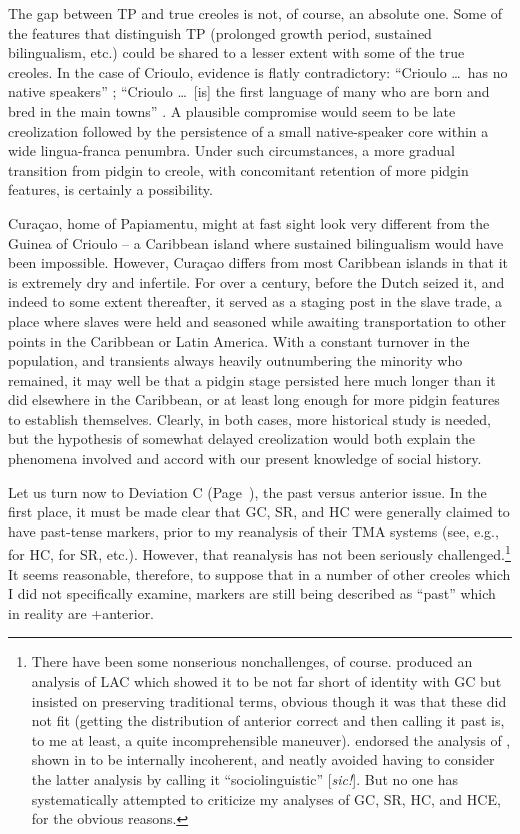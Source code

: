The gap between TP and true creoles is not, of course, an abso\-lute one. Some of the features that distinguish TP (prolonged growth period, sustained bilingualism, etc.) could be shared to a lesser extent with some of the true creoles. In the case of Crioulo, evidence is flatly contradictory: ``Crioulo \ldots~has no native speakers'' \citep{Alleyne1979}; ``Crioulo \ldots~[is] the first language of many who are born and bred in the main towns'' \citep[vii]{Wilson1962}. A plausible compromise would seem to be late creolization followed by the persistence of a small native-speaker core within a wide lingua-franca penumbra. Under such circumstances, a more gradual transition from pidgin to creole, with concomitant retention of more pidgin features, is certainly a possibility. 

Curaçao, home of Papiamentu, might at fast sight look very different from the Guinea of Crioulo -- a Caribbean island where sustained bilingualism would have been impossible. However, Curaçao differs from most Caribbean islands in that it is extremely dry and infertile. For over a century, before the Dutch seized it, and indeed to some extent thereafter, it served as a staging post in the slave trade, a place where slaves were held and seasoned while awaiting trans\-portation to other points in the Caribbean or Latin America. With a constant turnover in the population, and transients always heavily outnumbering the minority who remained, it may well be that a pidgin stage persisted here much longer than it did elsewhere in the Caribbean, or at least long enough for more pidgin features to establish themselves. Clearly, in both cases, more historical study is needed, but the hypothe\-sis of somewhat delayed creolization would both explain the phe\-nomena involved and accord with our present knowledge of social history.


Let us turn now to Deviation C (Page~\pageref{majordeviations}), the past versus anterior issue. In the first place, it must be made clear that GC, SR, and HC were generally claimed to have past-tense markers, prior to my re\-analysis of their TMA systems (see, e.g., \citet{Hall1953} for HC, \citet{Voorhoeve1957} for SR, etc.). However, that reanalysis has not been seriously challenged.\footnote{There have been some nonserious nonchallenges, of course. \citet{Christie1976} produced an analysis of LAC which showed it to be not far short of identity with GC but insisted on preserving traditional terms, obvious though it was that these did not fit (getting the distri\-bution of anterior correct and then calling it past is, to me at least, a quite incomprehensible maneuver). \citet{Seuren1980} endorsed the analysis of \citet{Voorhoeve1957}, shown in \citet{Bickerton1975} to be intern\-ally incoherent, and neatly avoided having to consider the latter analy\-sis by calling it ``sociolinguistic'' [\textit{sic!}]. But no one has systematically attempted to criticize my analyses of GC, SR, HC, and HCE, for the obvious reasons.} It seems reasonable, therefore, to suppose that in a number of other creoles which I did not specifically examine, markers are still being described as ``past'' which in reality are +anterior.

